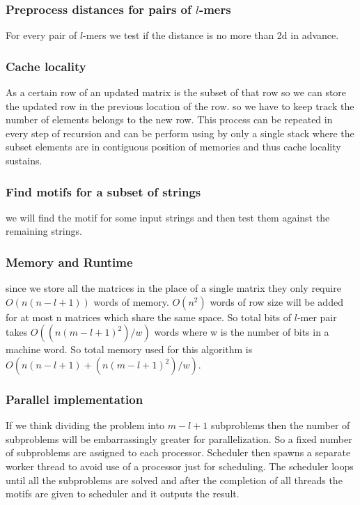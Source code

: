 {\subsubsection{Preprocess distances for pairs of $l$-mers}
For every pair of $l$-mers we test if the distance is no more than 2d in advance.

\subsubsection{Cache locality}
As a certain row of an updated matrix is the subset of that row so we can store the updated row in the previous location of the row. so we have to keep track the number of elements belongs to the new row. This process can be repeated in every step of recursion and can be perform using by only a single stack where the subset elements are in contiguous position of memories and thus cache locality sustains.

\subsubsection{Find motifs for a subset of strings}
we will find the motif for some input strings and then test them against the remaining strings.

\subsubsection{Memory and Runtime}
since we store all the matrices in the place of a single matrix they only require $O(n(n-l+1))$ words of memory. $O(n^2)$ words of row size will be added for at most n matrices which share the same space. So total bits of $l$-mer pair takes $O((n(m-l+1)^2)/w)$ words where w is the number of bits in a machine word. So total memory used for this algorithm is $O(n(n-l+1)+(n(m-l+1)^2)/w)$.

\subsubsection{Parallel implementation}
If we think dividing the problem into $m-l+1$ subproblems then the number of subproblems will be embarrassingly greater for parallelization. So a fixed number of subproblems are assigned to each processor. Scheduler then spawns a separate worker thread to avoid use of a processor just for scheduling. The scheduler loops until all the subproblems are solved and after the completion of all threads the motifs are given to scheduler and it outputs the result.

}
